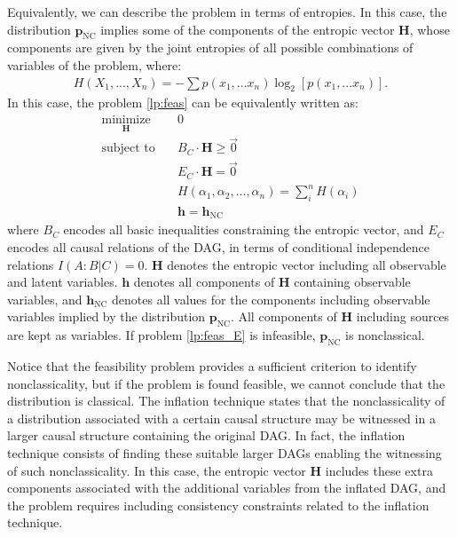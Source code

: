 \documentclass[reprint,pra, twocolumn, amsmath,amssymb,
 aps,superscriptaddress,]{revtex4-2}
\begin{document}
Equivalently, we can describe the problem in terms of entropies. In this case, the distribution $\mathbf{p}_{\text{NC}}$ implies some of the components of the entropic vector $\mathbf{H}$, whose components are given by the joint entropies of all possible combinations of variables of the problem, where:
%
\begin{align}
    H(X_1,...,X_n) = -\sum p(x_1, ... x_n)\log_2\left[p(x_1, ... x_n)\right]. \nonumber
\end{align}
%
In this case, the problem \eqref{lp:feas} can be equivalently written as:
%
\begin{align}\label{lp:feas_E}
    \underset{\mathbf{H}}{\text{minimize}} &\quad  0 \nonumber\\
    \text{subject to}&\quad B_C\cdot\mathbf{H}\ge \vec{0}\\
    &\quad E_C\cdot\mathbf{H} =  \vec{0}\\
    &\quad H(\alpha_1 , \alpha_2, ..., \alpha_n) =\sum_i^n H(\alpha_i) \nonumber\\
    & \quad \mathbf{h} = \mathbf{h}_{\text{NC}}\nonumber
\end{align}
%
where $B_C$ encodes all basic inequalities constraining the entropic vector, and $E_C$ encodes all causal relations of the DAG, in terms of conditional independence relations $I(A:B|C)=0$. $\mathbf{H}$ denotes the entropic vector including all observable and latent variables. $\mathbf{h}$ denotes all components of $\mathbf{H}$ containing observable variables, and $\mathbf{h}_{\text{NC}}$ denotes all values for the components including observable variables implied by the distribution $\mathbf{p}_{\text{NC}}$. All components of $\mathbf{H}$ including sources are kept as variables. If problem \eqref{lp:feas_E} is infeasible, $\mathbf{p}_{\text{NC}}$ is nonclassical.

Notice that the feasibility problem provides a sufficient criterion to identify nonclassicality, but if the problem is found feasible, we cannot conclude that the distribution is classical. The inflation technique states that the nonclassicality of a distribution associated with a certain causal structure may be witnessed in a larger causal structure containing the original DAG. In fact, the inflation technique consists of finding these suitable larger DAGs enabling the witnessing of such nonclassicality. In this case, the entropic vector $\mathbf{H}$ includes these extra components associated with the additional variables from the inflated DAG, and the problem requires including consistency constraints related to the inflation technique. 
\end{document}
